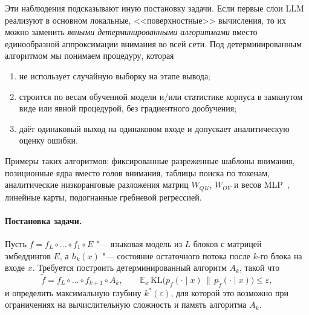 Эти наблюдения подсказывают иную постановку задачи. Если первые слои
LLM реализуют в основном локальные, <<поверхностные>> вычисления, то
их можно заменить \emph{явными детерминированными алгоритмами} вместо
единообразной аппроксимации внимания во всей сети. Под
детерминированным алгоритмом мы понимаем процедуру, которая
\begin{enumerate}
  \item не использует случайную выборку на этапе вывода;
  \item строится по весам обученной модели и/или статистике корпуса
    в замкнутом виде или явной процедурой, без градиентного
    дообучения;
  \item даёт одинаковый выход на одинаковом входе и допускает
    аналитическую оценку ошибки.
\end{enumerate}
Примеры таких алгоритмов: фиксированные разреженные шаблоны внимания,
позиционные ядра вместо голов внимания, таблицы поиска по токенам,
аналитические низкоранговые разложения матриц $W_{QK}$, $W_{OV}$ и
весов MLP~\cite{wong2025a3,yuan2023asvd,wang2025svdllm}, линейные
карты, подогнанные гребневой регрессией.

\paragraph{Постановка задачи.}
Пусть $f = f_L \circ \dots \circ f_1 \circ E$ "--- языковая модель из
$L$ блоков с матрицей эмбеддингов $E$, а $h_k(x)$ "--- состояние
остаточного потока после $k$-го блока на входе $x$. Требуется
построить детерминированный алгоритм $A_k$, такой что
\[
  \tilde f = f_L \circ \dots \circ f_{k+1} \circ A_k,
  \qquad
  \mathbb{E}_{x}\,
  \mathrm{KL}\bigl(p_f(\cdot \mid x)\,\|\,p_{\tilde f}(\cdot \mid x)\bigr)
  \le \varepsilon,
\]
и определить максимальную глубину $k^{*}(\varepsilon)$, для которой
это возможно при ограничениях на вычислительную сложность и память
алгоритма $A_k$.

